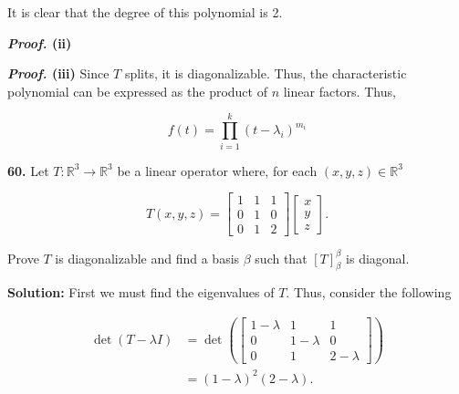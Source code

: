 \documentclass[12pt, a4paper]{article}
\begin{document}
\vspace{2mm}

\noindent It is clear that the degree of this polynomial is 2. \square

\vspace{4mm}

\textbf{\textit{Proof.} (ii)}

\vspace{4mm}

\textbf{\textit{Proof.} (iii)} Since $T$ splits, it is diagonalizable. Thus, the characteristic polynomial can be expressed as the product of $n$ linear factors. Thus,

\begin{equation*}
    f(t)=\prod_{i=1}^k(t-\lambda_i)^{m_i}
\end{equation*}

\vspace{4mm}

\noindent\textbf{60.} Let $T\colon\mathbb{R}^3\rightarrow\mathbb{R}^3$ be a linear operator where, for each $(x,y,z)\in\mathbb{R}^3$

\begin{equation*}
    T(x,y,z)=
    \begin{bmatrix}
        1 & 1 & 1 \\
        0 & 1 & 0 \\
        0 & 1 & 2
    \end{bmatrix}
    \begin{bmatrix}
        x \\
        y \\
        z
    \end{bmatrix}.
\end{equation*}

\vspace{2mm}

\noindent Prove $T$ is diagonalizable and find a basis $\beta$ such that $[T]_{\beta}^{\beta}$ is diagonal.

\vspace{6mm}

\textbf{Solution:} First we must find the eigenvalues of $T$. Thus, consider the following

\begin{equation*}
    \begin{split}
        \det(T-\lambda I) &= \det(\begin{bmatrix}
                                    1-\lambda & 1 & 1 \\
                                    0 & 1-\lambda & 0 \\
                                    0 & 1 & 2-\lambda \end{bmatrix}) \\
        &= (1-\lambda)^2(2-\lambda).
    \end{split}
\end{equation*}
\end{document}
